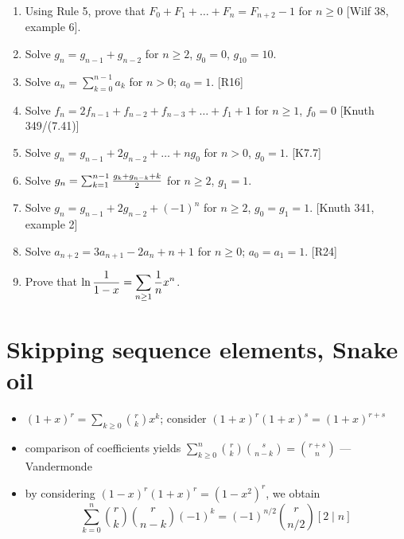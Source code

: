 \documentclass[10pt, a4paper]{article}
\newcommand*\ruleline[1]{\par\noindent\raisebox{.8ex}{\makebox[\linewidth]{\hrulefill\hspace{1ex}\raisebox{-.8ex}{#1}\hspace{1ex}\hrulefill}}}
\def\ans#1{\big[\hskip 2mm {#1}\hskip 2mm\big]}
\begin{document}
\ruleline{Exercises}

\begin{enumerate}
    \item Using Rule 5, prove that $F_0+F_1+\dots+F_n=F_{n+2}-1$ for $n\ge 0$ [Wilf 38, example 6].\\
        \ans{Compare gfs of both sides, left is $f/(1-x)$, where $f = x/(1-x-x^2)$, i.e. Fibonacci.}
    \item Solve $g_n=g_{n-1}+g_{n-2}$ for $n\ge 2$, $g_0 = 0$, $g_{10} = 10$.\\
        \ans{$g_n = {g_{10}\over F_{10}}F_n$, try the ``boundary method'' described above, computer necessary}
    \item Solve $a_n = \sum_{k=0}^{n-1}a_k$ for $n > 0$; $a_0 = 1$. [R16]\\
        \ans{$a_n = 2^{n-1}$ for $n \ge 1$}
    \item Solve $f_n=2f_{n-1}+f_{n-2}+f_{n-3}+\dots+f_1+1$ for $n\ge 1$, $f_0 = 0$ [Knuth 349/(7.41)]\\
        \ans{$F(x) = x/(1-3x+x^2)$; $f_n=F_{2n}$}
    \item Solve $g_n = g_{n-1} + 2g_{n-2}+\dots +ng_0$ for $n> 0$, $g_0 = 1$. [K7.7]\\
        \ans{$G(x)=1+x/(1-3x+x^2)$; $g_n=F_{2n} + [n=0]$}
    \item Solve $g_n = \sum_{k=1}^{n-1} {g_k + g_{n-k} + k\over 2}$ for $n\ge 2$, $g_1 = 1$.
    \item Solve $g_n=g_{n-1}+2g_{n-2}+(-1)^n$ for $n\ge 2$, $g_0 = g_1 = 1$. [Knuth 341, example 2]\\
        \ans{$G(x) = {1+x+x^2\over (1-2x)(1+x)^2}$; $g_n = {7\over 9}2^n + {1\over 9}(3n+2)(-1)^n$}
    \item Solve $a_{n+2}=3a_{n+1}-2a_n+n+1$ for $n\ge 0$; $a_0 = a_1 = 1$. [R24]\\
        \ans{$A(z) = {2\over 1-2z}-{1\over (1-z)^3}$; $a_n = 2^{n+1}-{n+2\choose 2}$}
    \item Prove that $\displaystyle \ln {1\over 1-x} = \sum_{n\ge 1} {1\over n} x^n$. \ans{consider $\int {1\over 1-x}$}
\end{enumerate}



\section{Skipping sequence elements, Snake oil}


\ruleline{Discovering combinatorial identities via gfs [Knuth 198, Vandermonde and 5.55]}
\begin{itemize}
    \item $(1+x)^r = \sum_{k\ge 0} {r\choose k}x^k$; consider $(1+x)^r(1+x)^s = (1+x)^{r+s}$
    \item comparison of coefficients yields $\sum_{k\ge 0}^n {r\choose k}{s\choose n-k}={r+s\choose n}$ --- Vandermonde
    \item by considering $(1-x)^r(1+x)^r = (1-x^2)^r$, we obtain $$\sum_{k=0}^n {r\choose k}{r\choose n-k}(-1)^k = (-1)^{n/2}{r\choose n/2}[2\mid n]$$
\end{itemize}
\end{document}
